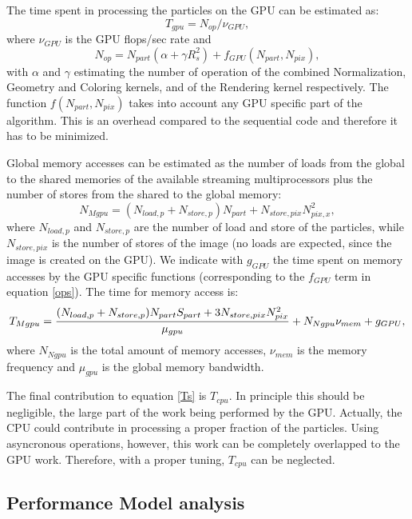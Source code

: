 \documentclass[11pt]{article}
\begin{document}
The time spent in processing the particles on the GPU can be estimated as:
\begin{equation}
T_{gpu} = N_{op}/\nu_{GPU},
\end{equation}
where $\nu_{GPU}$ is the GPU flops/sec rate and
\begin{equation}\label{ops}
N_{op} = N_{part}(\alpha + \gamma R_s^2) + f_{GPU}(N_{part},N_{pix}),
\end{equation}
with $\alpha$ and $\gamma$ estimating the number of operation of 
the combined Normalization, Geometry and Coloring kernels,  
and of the Rendering kernel respectively. The function 
$f(N_{part},N_{pix})$ takes into account any GPU specific part of the algorithm. 
This is an overhead compared to the sequential code and therefore it has to 
be minimized.

Global memory accesses can be estimated 
as the number of loads from the global to the shared memories of the available 
streaming multiprocessors plus the number of stores from the shared to the global memory: 
\begin{equation}
N_{Mgpu} = (N_{load,p} + N_{store,p}) N_{part} + N_{store,pix} N_{pix,x}^2,
\end{equation}
where $N_{load,p}$ and $N_{store,p}$ are the number of load and store of the 
particles, while $N_{store,pix}$ is the number of stores of the image (no loads 
are expected, since the image is created on the GPU). 
We indicate with $g_{GPU}$ the time spent on memory accesses by the GPU specific 
functions (corresponding to the $f_{GPU}$ term in equation \eqref{ops}). 
The time for memory access is:
\begin{equation}\label{tmgpu}
T_{Mgpu} = {(N_{load,p} + N_{store,p}) N_{part} S_{part} 
+ 3 N_{store,pix} N_{pix}^2\over \mu_{gpu}}
+ N_{Ngpu} \nu_{mem} + g_{GPU},
\end{equation}
where $N_{Ngpu}$ is the total amount of memory accesses, $\nu_{mem}$ 
is the memory frequency and $\mu_{gpu}$ is the global memory bandwidth.

The final contribution to equation \eqref{Ts} is $T_{cpu}$. In principle this should be negligible, 
the large part of the work being performed by the GPU. Actually, the CPU
could contribute in processing a proper fraction of the particles. Using
asyncronous operations, however, this work can be completely overlapped 
to the GPU work. Therefore, with a proper tuning, $T_{cpu}$ can be neglected.

\subsection{Performance Model analysis}
\end{document}
